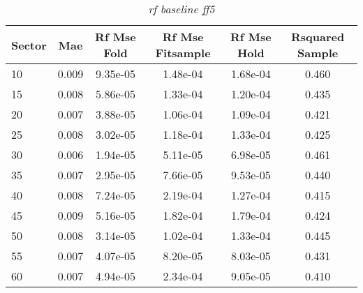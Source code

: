 \begin{table}[H]
\caption{\textit{rf baseline ff5}}\label{tab:rf_baseline_ff5}
\centering
\begin{tabular}{lccccc}
\hline\hline
Sector & Mae & Rf Mse Fold & Rf Mse Fitsample & Rf Mse Hold & Rsquared Sample \\ 
\hline
10 & 0.009 & 9.35e-05 & 1.48e-04 & 1.68e-04 & 0.460 \\ 
15 & 0.008 & 5.86e-05 & 1.33e-04 & 1.20e-04 & 0.435 \\ 
20 & 0.007 & 3.88e-05 & 1.06e-04 & 1.09e-04 & 0.421 \\ 
25 & 0.008 & 3.02e-05 & 1.18e-04 & 1.33e-04 & 0.425 \\ 
30 & 0.006 & 1.94e-05 & 5.11e-05 & 6.98e-05 & 0.461 \\ 
35 & 0.007 & 2.95e-05 & 7.66e-05 & 9.53e-05 & 0.440 \\ 
40 & 0.008 & 7.24e-05 & 2.19e-04 & 1.27e-04 & 0.415 \\ 
45 & 0.009 & 5.16e-05 & 1.82e-04 & 1.79e-04 & 0.424 \\ 
50 & 0.008 & 3.14e-05 & 1.02e-04 & 1.33e-04 & 0.445 \\ 
55 & 0.007 & 4.07e-05 & 8.20e-05 & 8.03e-05 & 0.431 \\ 
60 & 0.007 & 4.94e-05 & 2.34e-04 & 9.05e-05 & 0.410 \\ 
\hline
\end{tabular}
\end{table}
